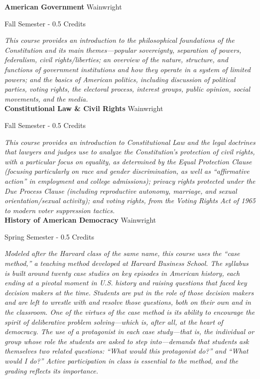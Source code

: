 \noindent\textbf{American Government} \hfill Wainwright

\noindent Fall Semester - 0.5 Credits

\vspace{1mm}\emph{This course provides an introduction to the philosophical foundations of the Constitution and its main themes—popular sovereignty, separation of powers, federalism, civil rights/liberties; an overview of the nature, structure, and functions of government institutions and how they operate in a system of limited powers; and the basics of American politics, including discussion of political parties, voting rights, the electoral process, interest groups, public opinion, social movements, and the media.}\\

\noindent\textbf{Constitutional Law \& Civil Rights} \hfill Wainwright

\noindent Fall Semester - 0.5 Credits

\vspace{1mm}\emph{This course provides an introduction to Constitutional Law and the legal doctrines that lawyers and judges use to analyze the Constitution’s protection of civil rights, with a particular focus on equality, as determined by the Equal Protection Clause (focusing particularly on race and gender discrimination, as well as “affirmative action” in employment and college admissions); privacy rights protected under the Due Process Clause (including reproductive autonomy, marriage, and sexual orientation/sexual activity); and voting rights, from the Voting Rights Act of 1965 to modern voter suppression tactics.}\\

\noindent\textbf{History of American Democracy} \hfill Wainwright

\noindent Spring Semester - 0.5 Credits

\vspace{1mm}\emph{Modeled after the Harvard class of the same name, this course uses the “case method,” a teaching method developed at Harvard Business School. The syllabus is built around twenty case studies on key episodes in American history, each ending at a pivotal moment in U.S. history and raising questions that faced key decision makers at the time. Students are put in the role of those decision makers and are left to wrestle with and resolve those questions, both on their own and in the classroom. One of the virtues of the case method is its ability to encourage the spirit of deliberative problem solving—which is, after all, at the heart of democracy. The use of a protagonist in each case study—that is, the individual or group whose role the students are asked to step into—demands that students ask themselves two related questions: “What would this protagonist do?” and “What would I do?” Active participation in class is essential to the method, and the grading reflects its importance.}\\

